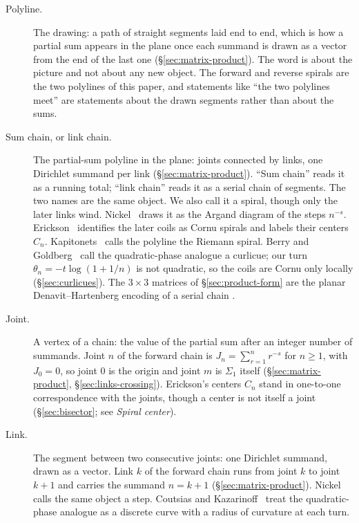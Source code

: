 \documentclass[11pt]{article}
\theoremstyle{definition}
\begin{document}
\begin{description}
\item[Polyline.]
The drawing: a path of straight segments laid end to end, which is
how a partial sum appears in the plane once each summand is drawn as
a vector from the end of the last one
(\S\ref{sec:matrix-product}).
The word is about the picture and not about any new object. The
forward and reverse spirals are the two polylines of this paper, and
statements like ``the two polylines meet'' are statements about the
drawn segments rather than about the sums.

\item[Sum chain, or link chain.]
The partial-sum polyline in the plane: joints connected by links,
one Dirichlet summand per link
(\S\ref{sec:matrix-product}).
``Sum chain'' reads it as a running total; ``link chain'' reads it
as a serial chain of segments. The two names are the same object.
We also call it a spiral, though only the later links wind.
Nickel~\cite{Nickel2013} draws it as the Argand diagram of the
steps $n^{-s}$.
Erickson~\cite{Erickson2005} identifies the later coils as Cornu
spirals and labels their centers $C_n$.
Kapitonets~\cite{Kapitonets2019} calls the polyline the Riemann
spiral.
Berry and Goldberg~\cite{BerryGoldberg1988} call the quadratic-phase
analogue a curlicue; our turn $\theta_n=-t\log(1+1/n)$ is not
quadratic, so the coils are Cornu only locally
(\S\ref{sec:curlicues}).
The $3\times3$ matrices of \S\ref{sec:product-form} are the planar
Denavit--Hartenberg encoding of a serial chain
\cite{DenavitHartenberg1955}.

\item[Joint.]
A vertex of a chain: the value of the partial sum after an integer
number of summands.
Joint $n$ of the forward chain is $J_n=\sum_{r=1}^{n}r^{-s}$ for
$n\ge1$, with $J_0=0$, so joint $0$ is the origin and joint $m$ is $\Sigma_1$ itself
(\S\ref{sec:matrix-product}, \S\ref{sec:links-crossing}).
Erickson's centers $C_n$ stand in one-to-one correspondence with the
joints, though a center is not itself a joint
(\S\ref{sec:bisector}; see \emph{Spiral center}).

\item[Link.]
The segment between two consecutive joints: one Dirichlet summand,
drawn as a vector.
Link $k$ of the forward chain runs from joint $k$ to joint $k+1$ and
carries the summand $n=k+1$
(\S\ref{sec:matrix-product}).
Nickel calls the same object a step.
Coutsias and Kazarinoff~\cite{CoutsiasKazarinoff1987} treat the
quadratic-phase analogue as a discrete curve with a radius of curvature
at each turn.


\end{description}
\end{document}

